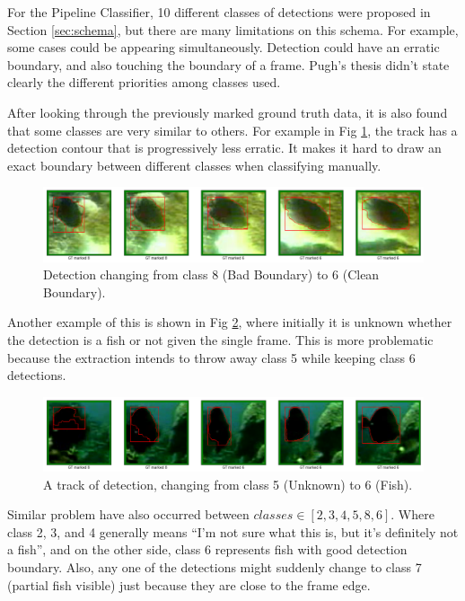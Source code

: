 \documentclass[bsc,logo,twoside,fullspacing,parskip]{infthesis}
\begin{document}
For the Pipeline Classifier, 10 different classes of detections were proposed in Section \ref{sec:schema}, but there are many limitations on this schema.
For example, some cases could be appearing simultaneously. Detection could have an erratic boundary, and also touching the boundary of a frame. Pugh's thesis didn't state clearly the different priorities among classes used. 

After looking through the previously marked ground truth data, it is also found that some classes are very similar to others. For example in Fig \ref{fig:class68}, the track has a detection contour that is progressively less erratic. It makes it hard to draw an exact boundary between different classes when classifying manually.

\begin{figure}[h]
\centering
    \includegraphics[scale=0.34]{graph/6-8.png}
    \caption{Detection changing from class 8 (Bad Boundary) to 6 (Clean Boundary).}
    \label{fig:class68}
\end{figure}

Another example of this is shown in Fig \ref{fig:class56}, where initially it is unknown whether the detection is a fish or not given the single frame. This is more problematic because the extraction intends to throw away class 5 while keeping class 6 detections. 

\begin{figure}[ht]
\centering
    \includegraphics[scale=0.34]{graph/5-6.png}
    \caption{A track of detection, changing from class 5 (Unknown) to 6 (Fish).}
    \label{fig:class56}
\end{figure}

Similar problem have also occurred between \(classes\in[2,3,4,5,8,6]\). Where class 2, 3, and 4 generally means ``I'm not sure what this is, but it's definitely not a fish'', and on the other side, class 6 represents fish with good detection boundary. 
Also, any one of the detections might suddenly change to class 7 (partial fish visible) just because they are close to the frame edge. 
\end{document}
